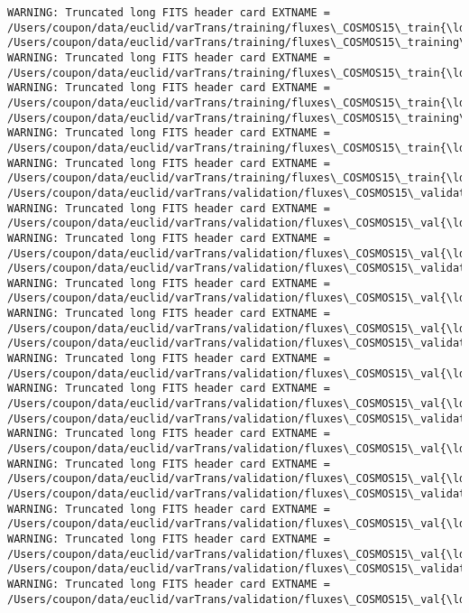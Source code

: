 \documentclass[11pt]{article}
\begin{document}
\begin{Verbatim}[commandchars=\\\{\}]
WARNING: Truncated long FITS header card EXTNAME = /Users/coupon/data/euclid/varTrans/training/fluxes\_COSMOS15\_train{\ldots}
/Users/coupon/data/euclid/varTrans/training/fluxes\_COSMOS15\_training\_8.fits
WARNING: Truncated long FITS header card EXTNAME = /Users/coupon/data/euclid/varTrans/training/fluxes\_COSMOS15\_train{\ldots}
WARNING: Truncated long FITS header card EXTNAME = /Users/coupon/data/euclid/varTrans/training/fluxes\_COSMOS15\_train{\ldots}
/Users/coupon/data/euclid/varTrans/training/fluxes\_COSMOS15\_training\_9.fits
WARNING: Truncated long FITS header card EXTNAME = /Users/coupon/data/euclid/varTrans/training/fluxes\_COSMOS15\_train{\ldots}
WARNING: Truncated long FITS header card EXTNAME = /Users/coupon/data/euclid/varTrans/training/fluxes\_COSMOS15\_train{\ldots}
/Users/coupon/data/euclid/varTrans/validation/fluxes\_COSMOS15\_validation\_0.fits
WARNING: Truncated long FITS header card EXTNAME = /Users/coupon/data/euclid/varTrans/validation/fluxes\_COSMOS15\_val{\ldots}
WARNING: Truncated long FITS header card EXTNAME = /Users/coupon/data/euclid/varTrans/validation/fluxes\_COSMOS15\_val{\ldots}
/Users/coupon/data/euclid/varTrans/validation/fluxes\_COSMOS15\_validation\_1.fits
WARNING: Truncated long FITS header card EXTNAME = /Users/coupon/data/euclid/varTrans/validation/fluxes\_COSMOS15\_val{\ldots}
WARNING: Truncated long FITS header card EXTNAME = /Users/coupon/data/euclid/varTrans/validation/fluxes\_COSMOS15\_val{\ldots}
/Users/coupon/data/euclid/varTrans/validation/fluxes\_COSMOS15\_validation\_2.fits
WARNING: Truncated long FITS header card EXTNAME = /Users/coupon/data/euclid/varTrans/validation/fluxes\_COSMOS15\_val{\ldots}
WARNING: Truncated long FITS header card EXTNAME = /Users/coupon/data/euclid/varTrans/validation/fluxes\_COSMOS15\_val{\ldots}
/Users/coupon/data/euclid/varTrans/validation/fluxes\_COSMOS15\_validation\_3.fits
WARNING: Truncated long FITS header card EXTNAME = /Users/coupon/data/euclid/varTrans/validation/fluxes\_COSMOS15\_val{\ldots}
WARNING: Truncated long FITS header card EXTNAME = /Users/coupon/data/euclid/varTrans/validation/fluxes\_COSMOS15\_val{\ldots}
/Users/coupon/data/euclid/varTrans/validation/fluxes\_COSMOS15\_validation\_4.fits
WARNING: Truncated long FITS header card EXTNAME = /Users/coupon/data/euclid/varTrans/validation/fluxes\_COSMOS15\_val{\ldots}
WARNING: Truncated long FITS header card EXTNAME = /Users/coupon/data/euclid/varTrans/validation/fluxes\_COSMOS15\_val{\ldots}
/Users/coupon/data/euclid/varTrans/validation/fluxes\_COSMOS15\_validation\_5.fits
WARNING: Truncated long FITS header card EXTNAME = /Users/coupon/data/euclid/varTrans/validation/fluxes\_COSMOS15\_val{\ldots}

\end{Verbatim}
\end{document}
